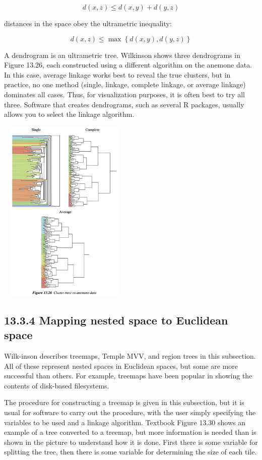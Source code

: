 \[
d(x,z) \leqslant d(x,y)+d(y,z)
\]

\noindent distances in the space obey the ultrametric inequality:

\[
d(x,z) \leqslant \max \left\{d(x,y),d(y,z)\right\}
\]

A dendrogram is an ultrametric tree. Wilkinson shows three dendrograms
in Figure 13.26, each constructed using a different algorithm on the
anemone data. In this case, average linkage works best to reveal the
true clusters, but in practice, no one method (single, linkage, complete
linkage, or average linkage) dominates all cases. Thus, for
visualization purposes, it is often best to try all three. Software that
creates dendrograms, such as several R packages, usually allows you to
select the linkage algorithm.

\includegraphics[height=3.5in,width=2.5in]{fiDendrograms.png}

\hypertarget{mapping-nested-space-to-euclidean-space}{%
\subsection{13.3.4 Mapping nested space to Euclidean
space}\label{mapping-nested-space-to-euclidean-space}}

Wilk-inson describes treemaps, Temple MVV, and region trees in this
subsection. All of these represent nested spaces in Euclidean spaces,
but some are more successful than others. For example, treemaps have
been popular in showing the contents of disk-based filesystems.

The procedure for constructing a treemap is given in this subsection,
but it is usual for software to carry out the procedure, with the user
simply specifying the variables to be used and a linkage algorithm.
Textbook Figure 13.30 shows an example of a tree converted to a treemap,
but more information is needed than is shown in the picture to
understand how it is done. First there is some variable for splitting
the tree, then there is some variable for determining the size of each
tile.

